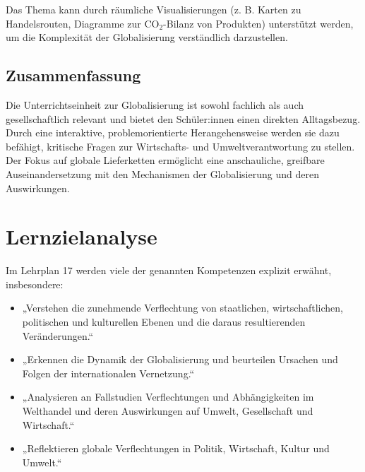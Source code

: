 Das Thema kann durch räumliche Visualisierungen (z. B. Karten zu Handelsrouten, Diagramme zur CO$_2$-Bilanz von Produkten) unterstützt werden, um die Komplexität der Globalisierung verständlich darzustellen.

\subsection{Zusammenfassung}
Die Unterrichtseinheit zur Globalisierung ist sowohl fachlich als auch gesellschaftlich relevant und bietet den Schüler:innen einen direkten Alltagsbezug. Durch eine interaktive, problemorientierte Herangehensweise werden sie dazu befähigt, kritische Fragen zur Wirtschafts- und Umweltverantwortung zu stellen. Der Fokus auf globale Lieferketten ermöglicht eine anschauliche, greifbare Auseinandersetzung mit den Mechanismen der Globalisierung und deren Auswirkungen.

\section{Lernzielanalyse}
Im Lehrplan 17 werden viele der genannten Kompetenzen explizit erwähnt, insbesondere:
\begin{itemize}
    \item „Verstehen die zunehmende Verflechtung von staatlichen, wirtschaftlichen, politischen und kulturellen Ebenen und die daraus resultierenden Veränderungen.“
    \item „Erkennen die Dynamik der Globalisierung und beurteilen Ursachen und Folgen der internationalen Vernetzung.“
    \item „Analysieren an Fallstudien Verflechtungen und Abhängigkeiten im Welthandel und deren Auswirkungen auf Umwelt, Gesellschaft und Wirtschaft.“
    \item „Reflektieren globale Verflechtungen in Politik, Wirtschaft, Kultur und Umwelt.“
\end{itemize}

